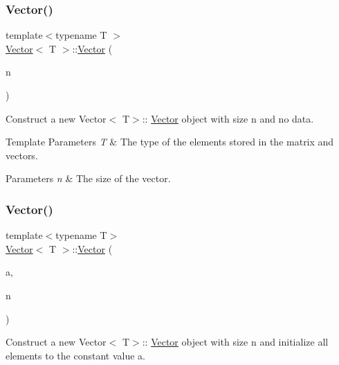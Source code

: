 \subsubsection{\texorpdfstring{Vector()}{Vector()}\hspace{0.1cm}{\footnotesize\ttfamily [2/5]}}
{\footnotesize\ttfamily template$<$typename T $>$ \\
\mbox{\hyperlink{classVector}{Vector}}$<$ T $>$\+::\mbox{\hyperlink{classVector}{Vector}} (\begin{DoxyParamCaption}\item[{const unsigned int}]{n }\end{DoxyParamCaption})}



Construct a new Vector$<$ T$>$\+:\+: \mbox{\hyperlink{classVector}{Vector}} object with size {\ttfamily n} and no data. 


\begin{DoxyTemplParams}{Template Parameters}
{\em T} & The type of the elements stored in the matrix and vectors. \\
\hline
\end{DoxyTemplParams}

\begin{DoxyParams}{Parameters}
{\em n} & The size of the vector. \\
\hline
\end{DoxyParams}
\mbox{\label{classVector_aa2bc8aac00503574bac8302652ef7ba0}} 
\subsubsection{\texorpdfstring{Vector()}{Vector()}\hspace{0.1cm}{\footnotesize\ttfamily [3/5]}}
{\footnotesize\ttfamily template$<$typename T$>$ \\
\mbox{\hyperlink{classVector}{Vector}}$<$ T $>$\+::\mbox{\hyperlink{classVector}{Vector}} (\begin{DoxyParamCaption}\item[{const T \&}]{a,  }\item[{const unsigned int}]{n }\end{DoxyParamCaption})}



Construct a new Vector$<$ T$>$\+:\+: \mbox{\hyperlink{classVector}{Vector}} object with size {\ttfamily n} and initialize all elements to the constant value {\ttfamily a}. 


